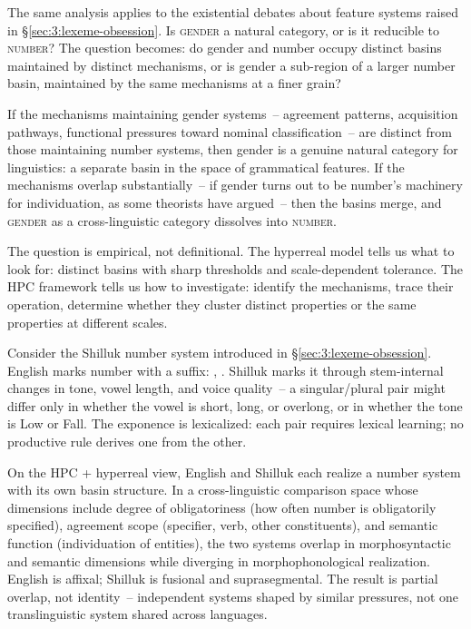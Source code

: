 The same analysis applies to the existential debates about feature systems raised in §\ref{sec:3:lexeme-obsession}. Is \textsc{gender} a natural category, or is it reducible to \textsc{number}? The question becomes: do gender and number occupy distinct basins maintained by distinct mechanisms, or is gender a sub-region of a larger number basin, maintained by the same mechanisms at a finer grain?

If the mechanisms maintaining gender systems~-- agreement patterns, acquisition pathways, functional pressures toward nominal classification~-- are distinct from those maintaining number systems, then gender is a genuine natural category for linguistics: a separate basin in the space of grammatical features. If the mechanisms overlap substantially~-- if gender turns out to be number's machinery for individuation, as some theorists have argued~-- then the basins merge, and \textsc{gender} as a cross-linguistic category dissolves into \textsc{number}.

The question is empirical, not definitional. The hyperreal model tells us what to look for: distinct basins with sharp thresholds and scale-dependent tolerance. The HPC framework tells us how to investigate: identify the mechanisms, trace their operation, determine whether they cluster distinct properties or the same properties at different scales.

Consider the Shilluk number system introduced in §\ref{sec:3:lexeme-obsession}. English marks number with a suffix: , . Shilluk marks it through stem-internal changes in tone, vowel length, and voice quality~-- a singular/plural pair might differ only in whether the vowel is short, long, or overlong, or in whether the tone is Low or Fall. The exponence is lexicalized: each pair requires lexical learning; no productive rule derives one from the other.

On the HPC + hyperreal view, English and Shilluk each realize a number system with its own basin structure. In a cross-linguistic comparison space whose dimensions include degree of obligatoriness (how often number is obligatorily specified), agreement scope (specifier, verb, other constituents), and semantic function (individuation of entities), the two systems overlap in morphosyntactic and semantic dimensions while diverging in morphophonological realization. English is affixal; Shilluk is fusional and suprasegmental. The result is partial overlap, not identity~-- independent systems shaped by similar pressures, not one translinguistic system shared across languages.

